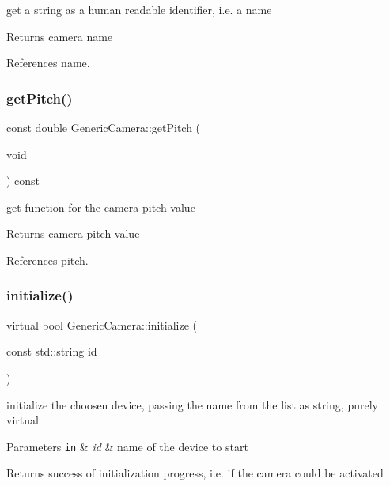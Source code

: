 get a string as a human readable identifier, i.\+e. a name \begin{DoxyReturn}{Returns}
camera name 
\end{DoxyReturn}


References name.

\mbox{\label{classGenericCamera_a429fbb0069ed11630ba5284235563f87}} 
\subsubsection{\texorpdfstring{get\+Pitch()}{getPitch()}}
{\footnotesize\ttfamily const double Generic\+Camera\+::get\+Pitch (\begin{DoxyParamCaption}\item[{void}]{ }\end{DoxyParamCaption}) const\hspace{0.3cm}{\ttfamily [inline]}}

get function for the camera pitch value \begin{DoxyReturn}{Returns}
camera pitch value 
\end{DoxyReturn}


References pitch.

\mbox{\label{classGenericCamera_ad050957bbb8003fc55f4656d43347f1e}} 
\subsubsection{\texorpdfstring{initialize()}{initialize()}}
{\footnotesize\ttfamily virtual bool Generic\+Camera\+::initialize (\begin{DoxyParamCaption}\item[{const std\+::string}]{id }\end{DoxyParamCaption})\hspace{0.3cm}{\ttfamily [pure virtual]}}

initialize the choosen device, passing the name from the list as string, purely virtual 
\begin{DoxyParams}[1]{Parameters}
\mbox{\tt in}  & {\em id} & name of the device to start \\
\hline
\end{DoxyParams}
\begin{DoxyReturn}{Returns}
success of initialization progress, i.\+e. if the camera could be activated 
\end{DoxyReturn}


